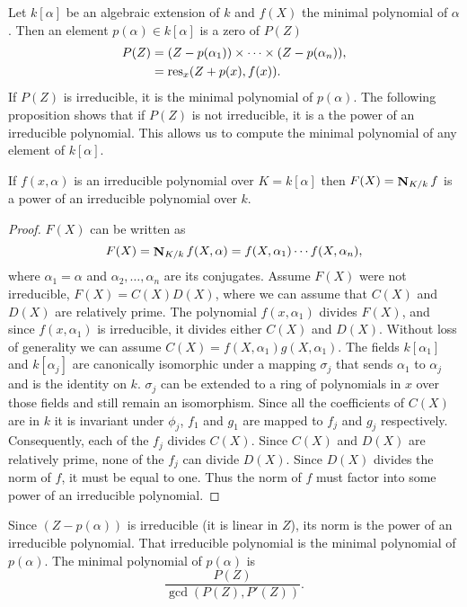 Let $k[\alpha]$ be an algebraic extension of $k$ and $f(X)$ the
minimal polynomial of $\alpha$.  Then an element $p(\alpha) \in
k[\alpha]$ is a zero of $P(Z)$
\[
\begin {aligned}
  P(Z) &= (Z - p(\alpha_1)) \times \cdots \times (Z - p(\alpha_n)), \\
  & = \mathop{\rm res}\nolimits_x(Z + p(x), f(x)).
\end{aligned}
\]
If $P(Z)$ is irreducible, it is the minimal polynomial of $p(\alpha)$.
The following proposition shows that if $P(Z)$ is not irreducible, it
is a the power of an irreducible polynomial.  This allows us to
compute the minimal polynomial of any element of $k[\alpha]$.

\begin{proposition}[\Trager]
If $f(x, \alpha)$ is an irreducible polynomial over $K = k[\alpha]$
then $F(X) = \mathop{\mathbf{N}}\nolimits_{K/k} f$ is a power of an irreducible polynomial over $k$.
\end{proposition}

\begin{proof}
$F(X)$ can be written as
\[
F(X) = \mathop{\mathbf{N}}\nolimits_{K/k} f(X, \alpha) = f(X, \alpha_1) \cdots f(X, \alpha_n),
\]
where $\alpha_1 = \alpha$ and $\alpha_2, \ldots, \alpha_n$ are its
conjugates.  Assume $F(X)$ were not irreducible, $F(X)= C(X) D(X)$,
where we can assume that $C(X)$ and $D(X)$ are relatively prime.  The
polynomial $f(x, \alpha_1)$ divides $F(X)$, and since $f(x, \alpha_1)$
is irreducible, it divides either $C(X)$ and $D(X)$.  Without loss of
generality we can assume $C(X) = f(X, \alpha_1) g(X, \alpha_1)$.  The
fields $k[\alpha_1]$ and $k[\alpha_j]$ are canonically isomorphic
under a mapping $\sigma_j$ that sends $\alpha_1$ to $\alpha_j$ and is
the identity on $k$.  $\sigma_j$ can be extended to a ring of
polynomials in $x$ over those fields and still remain an isomorphism.
Since all the coefficients of $C(X)$ are in $k$ it is invariant under
$\phi_j$, $f_1$ and $g_1$ are mapped to $f_j$ and $g_j$ respectively.
Consequently, each of the $f_j$ divides $C(X)$.  Since $C(X)$ and
$D(X)$ are relatively prime, none of the $f_j$ can divide $D(X)$.
Since $D(X)$ divides the norm of $f$, it must be equal to one. Thus
the norm of $f$ must factor into some power of an irreducible
polynomial.
\end{proof}

Since $(Z - p(\alpha))$ is irreducible (it is linear in $Z$), its norm
is the power of an irreducible polynomial.  That irreducible polynomial
is the minimal polynomial of $p(\alpha)$.  The minimal polynomial of
$p(\alpha)$ is 
\[
\frac{P(Z)}{\gcd(P(Z), P'(Z))}.
\]

